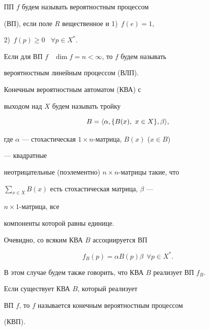 \begin{defn}


ПП $f$ будем называть вероятностным процессом 


(ВП), если поле $R$ вещественное и 1)~$f(e)=1$,


2)~$f(p)\ge0$ \ $\forall p\in X^*$.


\end{defn}





\begin{defn}


Если для ВП $f$ \ $\dim f=n<\infty$, то $f$ будем называть 


вероятностным линейным процессом (ВЛП).


\end{defn}





\begin{defn}


Конечным вероятностным автоматом (КВА) с


выходом над $X$ будем называть тройку


$$


B=\la\alpha,\{B(x),\ x\in X\},\beta\ra,


$$


где $\alpha$ --- стохастическая $1\times n$-матрица, $B(x)$ ($x\in B$)


--- квадратные


неотрицательные (поэлементно) $n\times n$-матрицы такие, что


$\sum\limits_{x\in X}B(x)$ есть стохастическая матрица, $\beta$ ---


$n\times1$-матрица, все


компоненты которой равны единице.


\end{defn}





Очевидно, со всяким КВА $B$ ассоциируется ВП


$$


f_B(p)=\alpha B(p)\beta\ \ \forall p\in X^*.


$$


В этом случае будем также говорить, что КВА $B$ реализует ВП $f_B$.





\begin{defn}


Если существует КВА $B$, который реализует


ВП $f$, то $f$ называется конечным вероятностным процессом


(КВП).


\end{defn}





